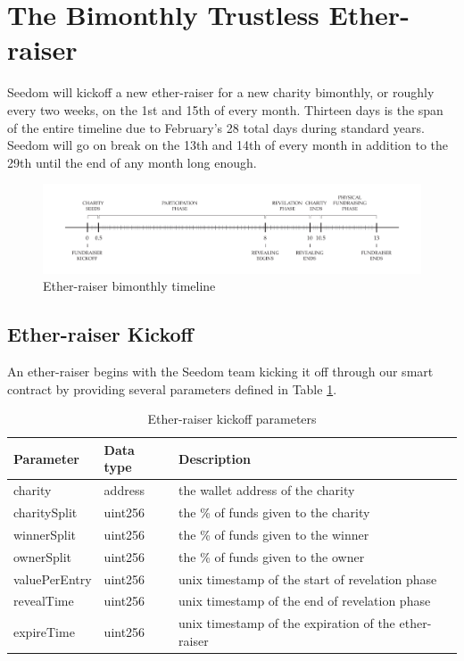 \documentclass[11pt]{article}
\begin{document}
\section{The Bimonthly Trustless Ether-raiser}

Seedom will kickoff a new ether-raiser for a new charity bimonthly, or roughly every two weeks, on the 1st and 15th of every month. Thirteen days is the span of the entire timeline due to February's 28 total days during standard years. Seedom will go on break on the 13th and 14th of every month in addition to the 29th until the end of any month long enough.

\begin{figure}[H]
\begin{center}
\includegraphics[width=1.0\textwidth]{fundraiserBimonthlyTimeline.pdf}
\caption{Ether-raiser bimonthly timeline}
\label{figure:fundraiserBimonthlyTimeline}
\end{center}
\end{figure}

\subsection{Ether-raiser Kickoff}
An ether-raiser begins with the Seedom team kicking it off through our smart contract by providing several parameters defined in Table \ref{tab:fundraiserKickoffParameters}.

\begin{table}[H]
\begin{center}
\begin{tabular}{| l | l | l |}
\hline
\textbf{Parameter} & \textbf{Data type} & \textbf{Description} \\ \hline
charity & address & the wallet address of the charity \\ \hline
charitySplit & uint256 & the \% of funds given to the charity \\ \hline
winnerSplit & uint256 & the \% of funds given to the winner \\ \hline
ownerSplit & uint256 & the \% of funds given to the owner \\ \hline
valuePerEntry & uint256 & unix timestamp of the start of revelation phase \\ \hline
revealTime & uint256 & unix timestamp of the end of revelation phase \\ \hline
expireTime & uint256 & unix timestamp of the expiration of the ether-raiser \\ \hline
\end{tabular}
\caption{Ether-raiser kickoff parameters}
\label{tab:fundraiserKickoffParameters}
\end{center}
\end{table}
\end{document}
